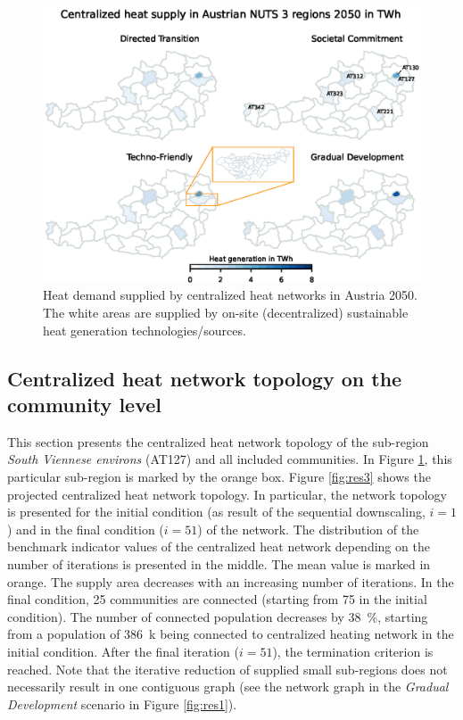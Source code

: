 \begin{figure}
	\centering
	\includegraphics[width=1\linewidth]{figures/4_Results/Heatmap.eps}
	\caption{Heat demand supplied by centralized heat networks in Austria 2050. The white areas are supplied by on-site (decentralized) sustainable heat generation technologies/sources.}
	\label{fig:res2}
\end{figure}

\subsection{Centralized heat network topology on the community level}\label{res:4}
This section presents the centralized heat network topology of the sub-region \textit{South Viennese environs} (AT127) and all included communities. In Figure \ref{fig:res2}, this particular sub-region is marked by the orange box. Figure \ref{fig:res3} shows the projected centralized heat network topology. In particular, the network topology is presented for the initial condition (as result of the sequential downscaling, $i=1$) and in the final condition ($i=51$) of the network. The distribution of the benchmark indicator values of the centralized heat network depending on the number of iterations is presented in the middle. The mean value is marked in orange. The supply area decreases with an increasing number of iterations. In the final condition, 25 communities are connected (starting from 75 in the initial condition). The number of connected population decreases by \SI{38}{\%}, starting from a population of \SI{386}{k} being connected to centralized heating network in the initial condition. After the final iteration ($i=51$), the termination criterion is reached. Note that the iterative reduction of supplied small sub-regions does not necessarily result in one contiguous graph (see the network graph in the \textit{Gradual Development} scenario in Figure \ref{fig:res1}).

